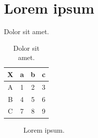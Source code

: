 \documentclass[main.tex]{subfiles}
\begin{document}
\section{Lorem ipsum}

Dolor sit amet.

\begin{table}[H]
    \centering

    \begin{tabular}{cccc}
        \hline
        X & a & b & c \tabularnewline
        \hline
        \hline
        A & 1 & 2 & 3 \tabularnewline
        B & 4 & 5 & 6 \tabularnewline
        C & 7 & 8 & 9 \tabularnewline
        \hline
    \end{tabular}

    \caption{Dolor sit amet.}
\end{table}

\begin{figure}[H]
    \centering
    \caption{Lorem ipsum.}
\end{figure}
\end{document}
